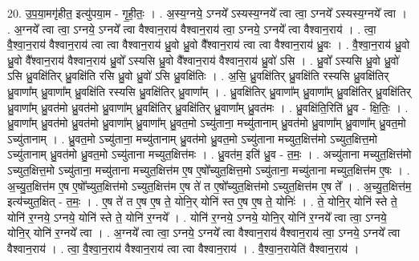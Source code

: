 \documentclass[17pt]{extarticle}
\begin{document}
20. उ॒प॒या॒मगृ॑हीत॒ इत्यु॑पया॒म - गृ॒ही॒तः॒ । . अ॒स्य॒ग्नये॒ ऽग्नये᳚ ऽस्यस्य॒ग्नये᳚ त्वा त्वा॒ ऽग्नये᳚ ऽस्यस्य॒ग्नये᳚ त्वा । . अ॒ग्नये᳚ त्वा त्वा॒ ऽग्नये॒ ऽग्नये᳚ त्वा वैश्वान॒राय॑ वैश्वान॒राय॑ त्वा॒ ऽग्नये॒ ऽग्नये᳚ त्वा वैश्वान॒राय॑ । . त्वा॒ वै॒श्वा॒न॒राय॑ वैश्वान॒राय॑ त्वा त्वा वैश्वान॒राय॑ ध्रु॒वो ध्रु॒वो वै᳚श्वान॒राय॑ त्वा त्वा वैश्वान॒राय॑ ध्रु॒वः । . वै॒श्वा॒न॒राय॑ ध्रु॒वो ध्रु॒वो वै᳚श्वान॒राय॑ वैश्वान॒राय॑ ध्रु॒वो᳚ ऽस्यसि ध्रु॒वो वै᳚श्वान॒राय॑ वैश्वान॒राय॑ ध्रु॒वो॑ ऽसि । . ध्रु॒वो᳚ ऽस्यसि ध्रु॒वो ध्रु॒वो॑ ऽसि ध्रु॒वक्षि॑तिर् ध्रु॒वक्षि॑ति रसि ध्रु॒वो ध्रु॒वो॑ ऽसि ध्रु॒वक्षि॑तिः । . अ॒सि॒ ध्रु॒वक्षि॑तिर् ध्रु॒वक्षि॑ति रस्यसि ध्रु॒वक्षि॑तिर् ध्रु॒वाणा᳚म् ध्रु॒वाणा᳚म् ध्रु॒वक्षि॑ति रस्यसि ध्रु॒वक्षि॑तिर् ध्रु॒वाणा᳚म् । . ध्रु॒वक्षि॑तिर् ध्रु॒वाणा᳚म् ध्रु॒वाणा᳚म् ध्रु॒वक्षि॑तिर् ध्रु॒वक्षि॑तिर् ध्रु॒वाणा᳚म् ध्रु॒वत॑मो ध्रु॒वत॑मो ध्रु॒वाणा᳚म् ध्रु॒वक्षि॑तिर् ध्रु॒वक्षि॑तिर् ध्रु॒वाणा᳚म् ध्रु॒वत॑मः । . ध्रु॒वक्षि॑ति॒रिति॑ ध्रु॒व - क्षि॒तिः॒ । . ध्रु॒वाणा᳚म् ध्रु॒वत॑मो ध्रु॒वत॑मो ध्रु॒वाणा᳚म् ध्रु॒वाणा᳚म् ध्रु॒वत॒मो ऽच्यु॑ताना॒ मच्यु॑तानाम् ध्रु॒वत॑मो ध्रु॒वाणा᳚म् ध्रु॒वाणा᳚म् ध्रु॒वत॒मो ऽच्यु॑तानाम् । . ध्रु॒वत॒मो ऽच्यु॑ताना॒ मच्यु॑तानाम् ध्रु॒वत॑मो ध्रु॒वत॒मो ऽच्यु॑ताना मच्युत॒क्षित्त॑मो ऽच्युत॒क्षित्त॒मो ऽच्यु॑तानाम् ध्रु॒वत॑मो ध्रु॒वत॒मो ऽच्यु॑ताना मच्युत॒क्षित्त॑मः । . ध्रु॒वत॑म॒ इति॑ ध्रु॒व - त॒मः॒ । . अच्यु॑ताना मच्युत॒क्षित्त॑मो ऽच्युत॒क्षित्त॒मो ऽच्यु॑ताना॒ मच्यु॑ताना मच्युत॒क्षित्त॑म ए॒ष ए॒षो᳚च्युत॒क्षित्त॒मो ऽच्यु॑ताना॒ मच्यु॑ताना मच्युत॒क्षित्त॑म ए॒षः । . अ॒च्यु॒त॒क्षित्त॑म ए॒ष ए॒षो᳚च्युत॒क्षित्त॑मो ऽच्युत॒क्षित्त॑म ए॒ष ते॑ त ए॒षो᳚च्युत॒क्षित्त॑मो ऽच्युत॒क्षित्त॑म ए॒ष ते᳚ । . अ॒च्यु॒त॒क्षित्त॑म॒ इत्य॑च्युत॒क्षित् - त॒मः॒ । . ए॒ष ते॑ त ए॒ष ए॒ष ते॒ योनि॒र् योनि॑ स्त ए॒ष ए॒ष ते॒ योनिः॑ । . ते॒ योनि॒र् योनि॑ स्ते ते॒ योनि॑ र॒ग्नये॒ ऽग्नये॒ योनि॑ स्ते ते॒ योनि॑ र॒ग्नये᳚ । . योनि॑ र॒ग्नये॒ ऽग्नये॒ योनि॒र् योनि॑ र॒ग्नये᳚ त्वा त्वा॒ ऽग्नये॒ योनि॒र् योनि॑ र॒ग्नये᳚ त्वा । . अ॒ग्नये᳚ त्वा त्वा॒ ऽग्नये॒ ऽग्नये᳚ त्वा वैश्वान॒राय॑ वैश्वान॒राय॑ त्वा॒ ऽग्नये॒ ऽग्नये᳚ त्वा वैश्वान॒राय॑ । . त्वा॒ वै॒श्वा॒न॒राय॑ वैश्वान॒राय॑ त्वा त्वा वैश्वान॒राय॑ । . वै॒श्वा॒न॒रायेति॑ वैश्वान॒राय॑ । \newline
\pagebreak
{}
\end{document}
